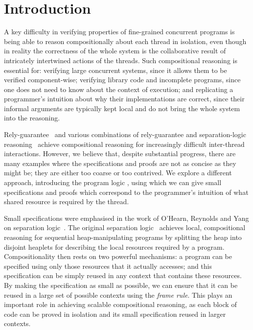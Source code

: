 \section{Introduction}
\label{sec:introduction}



A key difficulty in verifying properties of fine-grained concurrent
programs is being able to reason compositionally about each thread in
isolation, even though in reality the correctness of the whole system
is the collaborative result of intricately intertwined actions of the
threads.  Such compositional reasoning is essential for: verifying
large concurrent systems, since it allows them to be verified
component-wise;  verifying library code and incomplete programs,
since one does not need to know about the context of execution; and 
replicating a programmer's intuition about why their implementations
are correct, since their informal arguments are typically  kept local and do
not bring the whole system into the reasoning.


Rely-guarantee~\cite{rg} and various combinations of
rely-guarantee and separation-logic
reasoning~\cite{viktor-marriage,dg,lrg,cap-ecoop10,icap,tada} achieve
compositional reasoning for increasingly difficult inter-thread
interactions. However, we believe that, despite substantial progress, there are many
examples where the specifications and proofs are not as concise as
they might be; they  are either too coarse or
too 
contrived. 
We explore a different approach, introducing the
program logic \colosl, using which we can give small
specifications and proofs which correspond to the  programmer's intuition of what shared
resource
is required by the thread. 




Small specifications were emphasised in the work of O'Hearn, Reynolds
and Yang on separation logic~\cite{o2001local}.  The original
separation logic~\cite{rey02,seplog} achieves local, compositional reasoning
for sequential heap-manipulating programs by splitting the heap into
disjoint heaplets for describing the local resources required by a
program. Compositionality then rests on two powerful mechanisms: a program
can be specified using only those resources that it actually accesses;
and this specification can be simply reused in any context that
contains these resources.  By making the specification as small as
possible, we can ensure that it can be reused in a large set of
possible contexts using the {\em frame rule}. This plays an important
role in achieving scalable {compositional reasoning}, as each
block of code can be proved in isolation and its small specification
reused in larger contexts.


